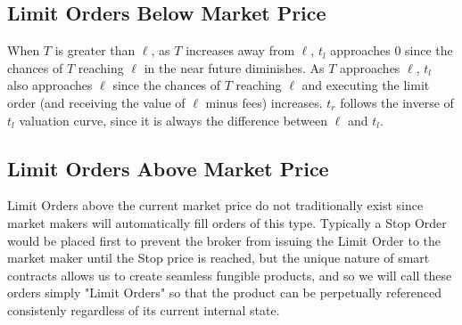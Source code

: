 \documentclass[12pt]{article}
\begin{document}
      \subsection{Limit Orders Below Market Price}
         \begin{center}
         \end{center}
         When $T$ is greater than $\ell$, as $T$ increases away from $\ell$, $t_{l}$ approaches $0$ since the chances of $T$ reaching $\ell$ in the near future diminishes. As $T$ approaches $\ell$, $t_{l}$ also approaches $\ell$ since the chances of $T$ reaching $\ell$ and executing the limit order (and receiving the value of $\ell$ minus fees) increases. $t_{r}$ follows the inverse of $t_{l}$ valuation curve, since it is always the difference between $\ell$ and $t_{l}$.

      \subsection{Limit Orders Above Market Price}
         Limit Orders above the current market price do not traditionally exist since market makers will automatically fill orders of this type. Typically a Stop Order would be placed first to prevent the broker from issuing the Limit Order to the market maker until the Stop price is reached, but the unique nature of smart contracts allows us to create seamless fungible products, and so we will call these orders simply "Limit Orders" so that the product can be perpetually referenced consistenly regardless of its current internal state.
\end{document}
